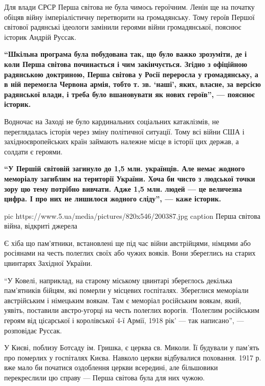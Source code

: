 Для влади СРСР Перша світова не була чимось героїчним. Ленін ще на початку
обіцяв війну імперіалістичну перетворити на громадянську. Тому героїв Першої
світової радянські ідеологи замінили героями війни громадянської, пояснює
історик Андрій Руссак.


\begin{leftbar}
	\bfseries
\enquote{Шкільна програма була побудована так, що було важко зрозуміти, де і коли Перша
світова починається і чим закінчується. Згідно з офіційною радянською
доктриною, Перша світова у Росії переросла у громадянську, а в ній перемогла
Червона армія, тобто т. зв. \enquote{наші}, яких, власне, за версією радянської влади,
і треба було вшановувати як нових героїв}, --- пояснює історик. 
\end{leftbar}

Водночас на Заході не було кардинальних соціальних катаклізмів, не
переглядалась історія через зміну політичної ситуації. Тому всі війни США і
західноєвропейських країн займають належне місце в історії цих держав, а
солдати є героями.

\begin{leftbar}
	\bfseries
\enquote{У Першій світовій загинуло до 1,5 млн. українців. Але немає жодного
меморіалу загиблим на території України. Хоча би чисто з людської точки
зору цю тему потрібно вивчати. Адже 1,5 млн. людей --- це величезна цифра. І
про них не лишилося жодного сліду}, --- каже історик. 
\end{leftbar}

\ifcmt
pic https://www.5.ua/media/pictures/820x546/200387.jpg
caption Перша світова війна, відкриті джерела
\fi

Є хіба що пам'ятники, встановлені ще під час війни австрійцями, німцями
або росіянами на честь полеглих своїх або чужих вояків. Вони збереглись на
старих цвинтарях Західної України.

\enquote{У Ковелі, наприклад, на старому міському цвинтарі збереглось декілька
пам'ятників бійцям, які померли у місцевих госпіталях. Збереглися
меморіали австрійським і німецьким воякам. Там є меморіал російським
воякам, який, уявіть, поставили австро-угорці на честь полеглих ворогів.
\enquote{Полеглим російським героям від цісарської і королівської 4-ї Армії, 1918
рік} --- так написано}, --- розповідає Руссак.

У Києві, поблизу Ботсаду ім. Гришка, є церква св. Миколи. Її будували у
пам'ять про померлих у госпіталях Києва. Навколо церкви відбувалися
поховання. 1917 р. вже мало би початися оздоблення церкви всередині, але
більшовики перекреслили цю справу --- Перша світова була для них чужою.


